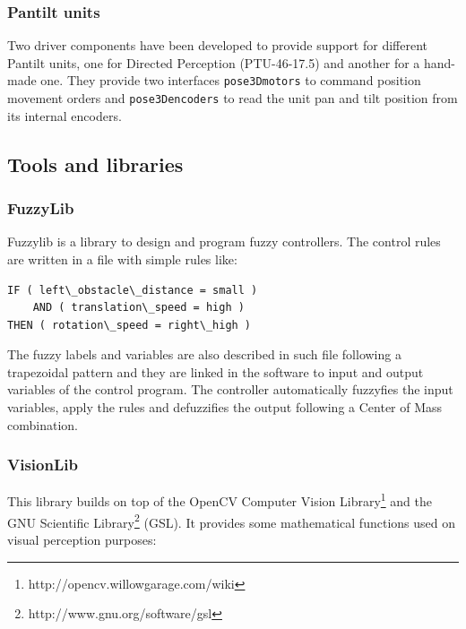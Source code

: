 \documentclass[twocolumn]{svjour3}          %
\begin{document}
\subsubsection{Pantilt units}

Two driver components have been developed to provide support for different Pantilt units, one for Directed Perception (PTU-46-17.5) and another for a hand-made one. They provide two interfaces \texttt{pose3Dmotors} to command position movement orders and \texttt{pose3Dencoders} to read the unit pan and tilt position from its internal encoders.

\subsection{Tools and libraries}
\label{sec:tools}

\subsubsection{FuzzyLib}

Fuzzylib is a library to design and program fuzzy controllers. The control rules are written in a file with simple rules like:

\begin{verbatim}
IF ( left\_obstacle\_distance = small ) 
    AND ( translation\_speed = high ) 
THEN ( rotation\_speed = right\_high )
\end{verbatim}

The fuzzy labels and variables are also described in such file following a trapezoidal pattern and they are linked in the software to input and output variables of the control program. The controller automatically fuzzyfies the input variables, apply the rules and defuzzifies the output following a Center of Mass combination.

\subsubsection{VisionLib}
\label{subsec:visionlib}

This library builds on top of the OpenCV Computer Vision Library\footnote{http://opencv.willowgarage.com/wiki} and the GNU Scientific Library\footnote{http://www.gnu.org/software/gsl} (GSL). It provides some mathematical functions used on visual perception purposes:
\end{document}
